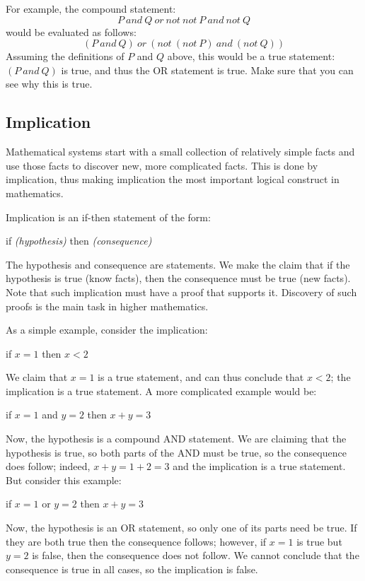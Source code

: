 \documentclass[letterpaper,12pt,fleqn]{article}
\begin{document}
For example, the compound statement:
\[P\ and\ Q\ or\ not\ not\ P\ and\ not\ Q\]
would be evaluated as follows:
\[(P\ and\ Q)\ or\ (not\ (not\ P)\ and\ (not\ Q))\]
Assuming the definitions of $P$ and $Q$ above, this would be a true statement:
$(P\ and\ Q)$ is true, and thus the OR statement is true. Make sure that you
can see why this is true.

\subsection*{Implication}

Mathematical systems start with a small collection of relatively simple facts
and use those facts to discover new, more complicated facts. This is done by
implication, thus making implication the most important logical construct in
mathematics.

Implication is an if-then statement of the form:

\hspace{0.5in}if \emph{(hypothesis)} then \emph{(consequence)}

The hypothesis and consequence are statements. We make the claim that if the
hypothesis is true (know facts), then the consequence must be true (new
facts). Note that such implication must have a proof that supports it.
Discovery of such proofs is the main task in higher mathematics.

As a simple example, consider the implication:

\hspace{0.5in}if $x=1$ then $x<2$

We claim that $x=1$ is a true statement, and can thus conclude that $x<2$; the
implication is a true statement. A more complicated example would be:

\hspace{0.5in}if $x=1$ and $y=2$ then $x+y=3$

Now, the hypothesis is a compound AND statement. We are claiming that the
hypothesis is true, so both parts of the AND must be true, so the consequence
does follow; indeed, $x+y=1+2=3$ and the implication is a true statement. But
consider this example:

\hspace{0.5in}if $x=1$ or $y=2$ then $x+y=3$

Now, the hypothesis is an OR statement, so only one of its parts need be true.
If they are both true then the consequence follows; however, if $x=1$ is true
but $y=2$ is false, then the consequence does not follow. We cannot conclude
that the consequence is true in all cases, so the implication is false.
\end{document}
